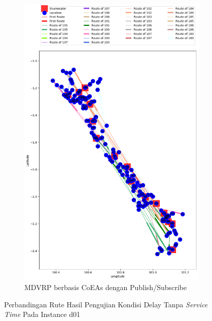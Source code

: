 \begin{figure}[H]\ContinuedFloat
	\centering
	\begin{subfigure}[t]{\textwidth}
		\centering
		\includegraphics[width=\textwidth]{Resources/Images/delayed_1/real_m15_n100_delayed_1_pubsub_coes}
		\caption{MDVRP berbasis CoEAs dengan Publish/Subscribe}
		\label{fig:real_m15_n100_delayed_1_pubsub_coes}
	\end{subfigure}
	\caption{Perbandingan Rute Hasil Pengujian Kondisi Delay Tanpa \textit{Service Time} Pada Instance d01}
	\label{fig:real_m15_n100_delayed_1_contd}
\end{figure}


